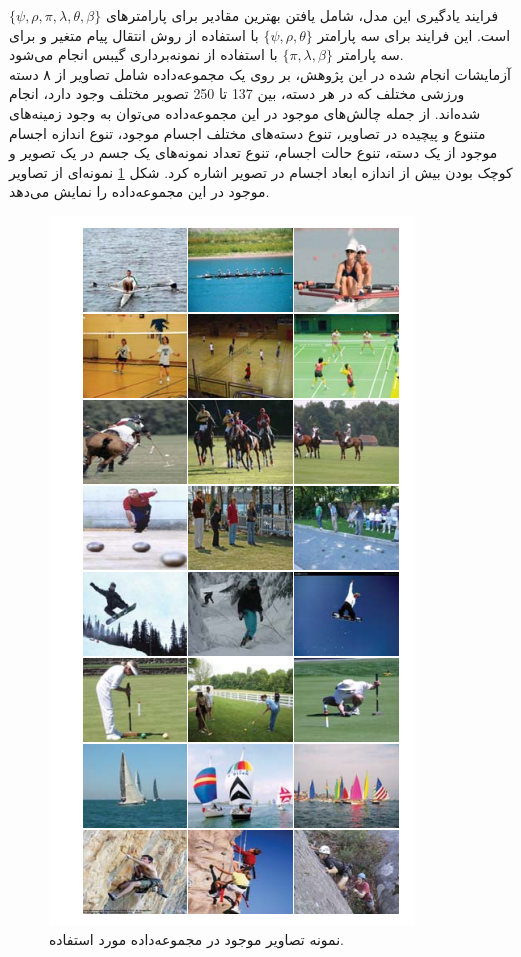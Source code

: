 \begin{enumerate}
فرایند یادگیری این مدل، شامل یافتن بهترین مقادیر برای پارامترهای 
$\{\psi,\rho,\pi,\lambda,\theta,\beta\}$
است.
این فرایند برای سه پارامتر 
$\{\psi,\rho,\theta\}$ 
با استفاده از روش انتقال پیام متغیر و برای سه پارامتر
$\{\pi,\lambda,\beta\}$
با استفاده از نمونه‌برداری گیبس انجام می‌شود.
\\
آزمایشات انجام شده در این پژوهش، بر روی یک مجموعه‌داده شامل تصاویر از ۸ دسته ورزشی مختلف که در هر دسته، بین 137 تا 250 تصویر مختلف وجود دارد، انجام شده‌اند. از جمله چالش‌های موجود در این مجموعه‌داده می‌توان به وجود زمینه‌های متنوع و پیچیده در تصاویر، تنوع دسته‌های مختلف اجسام موجود، تنوع اندازه اجسام موجود از یک دسته، تنوع حالت اجسام، تنوع تعداد نمونه‌های یک جسم در یک تصویر و کوچک بودن بیش از اندازه ابعاد اجسام در تصویر اشاره کرد. شکل
\ref{fig:lid}
نمونه‌ای از تصاویر موجود در این مجموعه‌داده را نمایش می‌دهد.

\begin{figure}[H]
\center
\includegraphics[scale=0.7]{./Imgs/li2007and_dataset.png}
\caption{نمونه تصاویر موجود در مجموعه‌داده مورد استفاده. \cite{li2007and}}
\label{fig:lid}
\end{figure}


\end{enumerate}
